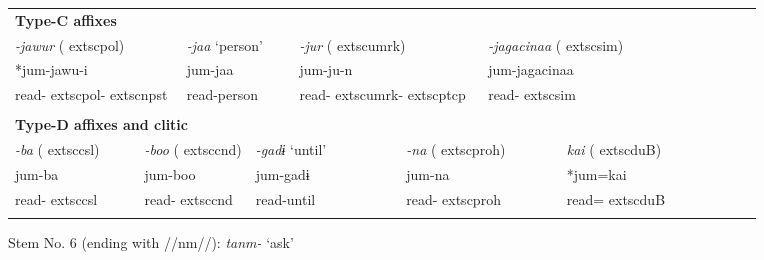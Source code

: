 \begin{tabularx}{\textwidth}{XXXXXXXXXXXXXXXXXXXXXXX}
\multicolumn{23}{X}{{\bfseries Type-C affixes}}\\
\multicolumn{4}{X}{{ \textit{{}-jawur} (	extsc{pol})}} & \multicolumn{3}{X}{{ \textit{{}-jaa} ‘person’}} & \multicolumn{4}{X}{{ \textit{{}-jur} (	extsc{umrk})}} & \multicolumn{4}{X}{{ \textit{{}-jagacinaa} (	extsc{sim})}} & \multicolumn{8}{X}{}\\
\multicolumn{4}{X}{{ *jum-jawu-i}} & \multicolumn{3}{X}{{ jum-jaa}} & \multicolumn{4}{X}{{ jum-ju-n}} & \multicolumn{4}{X}{{ jum-jagacinaa}} & \multicolumn{8}{X}{}\\
\multicolumn{4}{X}{read-	extsc{pol}-	extsc{npst}} & \multicolumn{3}{X}{read-person} & \multicolumn{4}{X}{read-	extsc{umrk}-	extsc{ptcp}} & \multicolumn{4}{X}{read-	extsc{sim}} & \multicolumn{8}{X}{}\\
\multicolumn{23}{X}{}\\
\multicolumn{23}{X}{{\bfseries Type-D affixes and clitic}}\\
\multicolumn{2}{X}{{ \textit{{}-ba} (	extsc{csl})}} & \multicolumn{4}{X}{{ \textit{{}-boo} (	extsc{cnd})}} & \multicolumn{3}{X}{{ \textit{{}-gadɨ} ‘until’}} & \multicolumn{4}{X}{{ \textit{{}-na} (	extsc{proh})}} & \multicolumn{4}{X}{{ \textit{kai} (	extsc{du}B)}} & \multicolumn{6}{X}{}\\
\multicolumn{2}{X}{{ jum-ba}} & \multicolumn{4}{X}{{ jum-boo}} & \multicolumn{3}{X}{{ jum-gadɨ}} & \multicolumn{4}{X}{{ jum-na}} & \multicolumn{4}{X}{{ *jum=kai}} & \multicolumn{6}{X}{}\\
\multicolumn{2}{X}{read-	extsc{csl}} & \multicolumn{4}{X}{read-	extsc{cnd}} & \multicolumn{3}{X}{read-until} & \multicolumn{4}{X}{read-	extsc{proh}} & \multicolumn{4}{X}{read=	extsc{du}B} & \multicolumn{6}{X}{}\\
\lspbottomrule
\end{tabularx}
Stem No. 6 (ending with //nm//): \textit{tanm-} ‘ask’

\tablefirsthead{}

